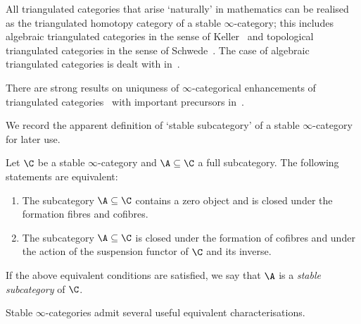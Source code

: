\documentclass[a4paper]{amsart}
\begin{document}
\begin{remark}
  All triangulated categories that arise `naturally' in mathematics can be
  realised as the triangulated homotopy category of a stable $\infty$-category; this includes
  algebraic triangulated categories in the sense of Keller~\cite{Kel06} and
  topological triangulated categories in the sense of Schwede~\cite{Sch10a}. The
  case of algebraic triangulated categories is dealt with
  in~.
\end{remark}

\begin{remark}
  There are strong results on uniquness of $\infty$-categorical enhancements of
  triangulated categories~\cite{Ant18,CNS22} with important precursors
  in~\cite{Sch01,SS02,Sch07}.
\end{remark}

We record the apparent definition of `stable subcategory' of a stable
$\infty$-category for later use.

\begin{defprop}
  Let $\C$ be a stable $\infty$-category and $\A\subseteq\C$ a full subcategory.
  The following statements are equivalent:
  \begin{enumerate}
  \item The subcategory $\A\subseteq\C$ contains a zero object and is closed
    under the formation fibres and cofibres.
  \item The subcategory $\A\subseteq\C$ is closed under the formation of
    cofibres and under the action of the suspension functor of $\C$ and its
    inverse.
  \end{enumerate}
  If the above equivalent conditions are satisfied, we say that $\A$ is a
  \emph{stable subcategory} of $\C$.
\end{defprop}

Stable $\infty$-categories admit several useful equivalent characterisations.
\end{document}
